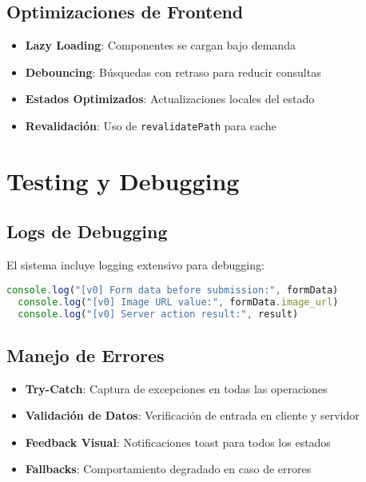 \documentclass[12pt,a4paper]{article}
\begin{document}
\subsection{Optimizaciones de Frontend}

\begin{itemize}
  \item \textbf{Lazy Loading}: Componentes se cargan bajo demanda
  \item \textbf{Debouncing}: Búsquedas con retraso para reducir consultas
  \item \textbf{Estados Optimizados}: Actualizaciones locales del estado
  \item \textbf{Revalidación}: Uso de \texttt{revalidatePath} para cache
\end{itemize}

\section{Testing y Debugging}

\subsection{Logs de Debugging}

El sistema incluye logging extensivo para debugging:

\begin{lstlisting}[language=JavaScript, caption=Ejemplo de logging]
  console.log("[v0] Form data before submission:", formData)
  console.log("[v0] Image URL value:", formData.image_url)
  console.log("[v0] Server action result:", result)
\end{lstlisting}

\subsection{Manejo de Errores}

\begin{itemize}
  \item \textbf{Try-Catch}: Captura de excepciones en todas las operaciones
  \item \textbf{Validación de Datos}: Verificación de entrada en cliente y servidor
  \item \textbf{Feedback Visual}: Notificaciones toast para todos los estados
  \item \textbf{Fallbacks}: Comportamiento degradado en caso de errores
\end{itemize}
\end{document}
